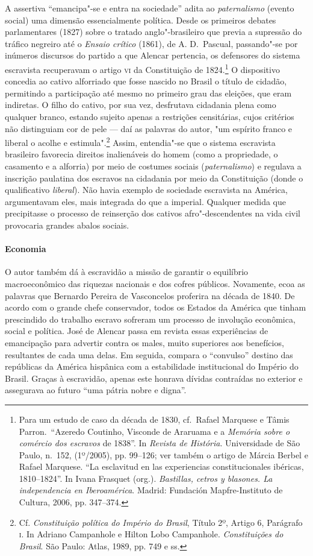 A assertiva ``emancipa"-se e entra na sociedade'' adita ao \textit{paternalismo}
(evento social) uma dimensão essencialmente política. Desde os primeiros debates parlamentares (1827) sobre
o tratado anglo"-brasileiro que previa a supressão do tráfico
negreiro até o \textit{Ensaio crítico} (1861), de A. D.~Pascual,
passando"-se por inúmeros discursos do partido a que Alencar pertencia, os
defensores do sistema escravista recuperavam o artigo \textsc{vi} da
Constituição de 1824.\footnote{ Para um estudo de caso da década de
1830, cf.~Rafael Marquese e Tâmis Parron.~``Azeredo Coutinho, Visconde
de Araruama e a \textit{Memória sobre o comércio dos escravos} de
1838''. In \textit{Revista de História}. Universidade de São Paulo, n.~152, (1º/2005), pp. 99--126; ver também
o artigo de Márcia Berbel e Rafael Marquese. “La esclavitud en las experiencias constitucionales ibéricas, 1810--1824”. In Ivana Frasquet (org.). \textit{Bastillas, cetros y blasones. La independencia en Iberoamérica}. Madrid: Fundación Mapfre-Instituto de Cultura, 2006, pp. 347--374.} O dispositivo concedia ao cativo
alforriado que fosse nascido no Brasil o título de cidadão, permitindo
a participação até mesmo no primeiro grau das eleições, que eram
indiretas. O filho do cativo, por sua vez, desfrutava cidadania plena
como qualquer branco, estando sujeito apenas a restrições censitárias,
cujos critérios não distinguiam cor de pele --- daí as palavras do autor, 
"um espírito franco e liberal o acolhe e estimula".\footnote{ Cf. \textit{Constituição política do Império do Brasil}, 
Título 2º, Artigo 6, Parágrafo \textsc{i}. In Adriano Campanhole e Hilton Lobo Campanhole. 
\textit{Constituições do Brasil}. São Paulo: Atlas, 1989, pp. 749 e ss.} 
Assim, entendia"-se que o sistema escravista brasileiro favorecia
direitos inalienáveis do homem (como a propriedade, o casamento e a alforria) por 
meio de costumes sociais (\textit{paternalismo}) e regulava a inscrição paulatina
dos escravos na cidadania por meio da Constituição (donde o qualificativo \textit{liberal}). Não havia
exemplo de sociedade escravista na América, argumentavam eles, mais
integrada do que a imperial. Qualquer medida que precipitasse o
processo de reinserção dos cativos afro"-descendentes na vida civil provocaria grandes abalos sociais. 

\paragraph{Economia} O autor também dá à  escravidão a missão de garantir o equilíbrio
macroeconômico das riquezas nacionais e dos cofres públicos.
Novamente, ecoa as palavras que Bernardo Pereira de Vasconcelos
proferira na década de 1840. De acordo com o grande chefe conservador,
todos os Estados da América que tinham prescindido do trabalho escravo
sofreram um processo de involução econômica, social e política. José de
Alencar passa em revista essas experiências de emancipação para
advertir contra os males, muito superiores aos benefícios, resultantes
de cada uma delas. Em seguida, compara o ``convulso'' destino das
repúblicas da América hispânica com a estabilidade institucional do
Império do Brasil. Graças à  escravidão, apenas este honrava dívidas
contraídas no exterior e assegurava ao futuro ``uma pátria nobre e digna''. 

